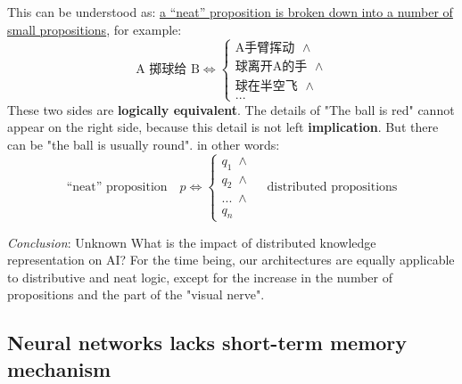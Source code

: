 \documentclass[12pt, orivec]{article}
\begin{document}
This can be understood as: \uline{a ``neat'' proposition is broken down into a number of small propositions}, for example:\begin{equation}
\mbox{A 掷球给 B} \Longleftrightarrow \left\{
                \begin{array}{l}
                  \mbox{A手臂挥动 } \; \wedge \\
                  \mbox{球离开A的手 } \; \wedge \\
                  \mbox{球在半空飞 } \; \wedge \\
                  ...
                \end{array}
              \right.
\end{equation}
These two sides are \textbf{logically equivalent}. The details of "The ball is red" cannot appear on the right side, because this detail is not left \textbf{implication}. But there can be "the ball is usually round". in other words:\begin{equation}
\boxed{\mbox{``neat'' proposition}} \quad p \Longleftrightarrow \left\{
                \begin{array}{l}
                  q_1 \; \wedge \\
                  q_2 \; \wedge \\
                  ... \; \wedge \\
                  q_n
                \end{array}
              \right.
\quad \boxed{\mbox{distributed propositions}}
\end{equation}

\textit{Conclusion}: Unknown What is the impact of distributed knowledge representation on AI? For the time being, our architectures are equally applicable to distributive and neat logic, except for the increase in the number of propositions and the part of the "visual nerve".

\subsection{Neural networks lacks short-term memory mechanism}
\end{document}
